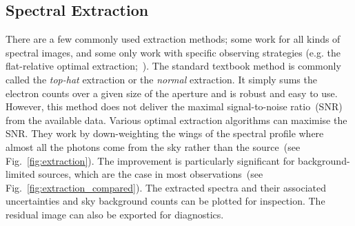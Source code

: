 \documentclass[linenumbers, twocolumn]{aastex631}
\begin{document}

\subsection{Spectral Extraction}
\label{sec:extract}
There are a few commonly used extraction methods; some work for all kinds of
spectral images, and some only work with specific observing strategies (e.g. the
flat-relative optimal extraction;~\citealt{2014A&A...561A..59Z}). The standard
textbook method is commonly called the \textit{top-hat} extraction or the
\textit{normal} extraction. It simply sums the electron counts over a given size
of the aperture and is robust and easy to use. However, this method does not
deliver the maximal signal-to-noise ratio~(SNR) from the available data. Various
optimal extraction algorithms can maximise the SNR. They work by down-weighting
the wings of the spectral profile where almost all the photons come from the sky
rather than the source~(see Fig.~\ref{fig:extraction}). The improvement is
particularly significant for background-limited sources, which are the case in
most observations~(see Fig.~\ref{fig:extraction_compared}). The extracted
spectra and their associated uncertainties and sky background counts can be
plotted for inspection. The residual image can also be exported for diagnostics.
\end{document}
